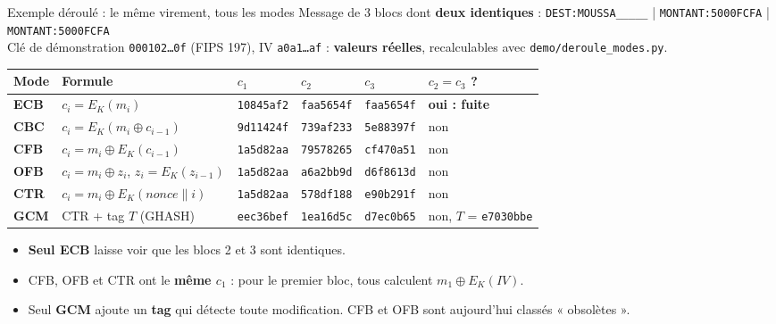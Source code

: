 \documentclass[aspectratio=169,10pt]{beamer}
\begin{document}
\begin{frame}{Exemple déroulé : le même virement, tous les modes}
  \small Message de 3 blocs dont \textbf{deux identiques} :
  \texttt{DEST:MOUSSA\_\_\_\_\_} \;|\; \texttt{MONTANT:5000FCFA} \;|\; \texttt{MONTANT:5000FCFA}\\[0.1em]
  \scriptsize Clé de démonstration \texttt{000102\ldots0f} (FIPS 197), IV \texttt{a0a1\ldots af} : \textbf{valeurs réelles}, recalculables avec \texttt{demo/deroule\_modes.py}.
  \vspace{0.3em}

  \centering\scriptsize
  \begin{tabular}{llllll}
    \toprule
    Mode & Formule & $c_1$ & $c_2$ & $c_3$ & $c_2 = c_3$ ? \\
    \midrule
    \textbf{ECB} & $c_i = E_K(m_i)$ & \texttt{10845af2} & \textcolor{espred}{\texttt{faa5654f}} & \textcolor{espred}{\texttt{faa5654f}} & \textcolor{espred}{\textbf{oui : fuite}} \\
    \textbf{CBC} & $c_i = E_K(m_i \oplus c_{i-1})$ & \texttt{9d11424f} & \texttt{739af233} & \texttt{5e88397f} & non \\
    \textbf{CFB} & $c_i = m_i \oplus E_K(c_{i-1})$ & \texttt{1a5d82aa} & \texttt{79578265} & \texttt{cf470a51} & non \\
    \textbf{OFB} & $c_i = m_i \oplus z_i$, $z_i = E_K(z_{i-1})$ & \texttt{1a5d82aa} & \texttt{a6a2bb9d} & \texttt{d6f8613d} & non \\
    \textbf{CTR} & $c_i = m_i \oplus E_K(\mathit{nonce} \| i)$ & \texttt{1a5d82aa} & \texttt{578df188} & \texttt{e90b291f} & non \\
    \textbf{GCM} & CTR + tag $T$ (GHASH) & \texttt{eec36bef} & \texttt{1ea16d5c} & \texttt{d7ec0b65} & non, $T$ = \texttt{e7030bbe} \\
    \bottomrule
  \end{tabular}
  \vspace{0.4em}

  \raggedright\scriptsize
  \begin{itemize}
    \item \textbf{Seul ECB} laisse voir que les blocs 2 et 3 sont identiques.
    \item CFB, OFB et CTR ont le \textbf{même $c_1$} : pour le premier bloc, tous calculent $m_1 \oplus E_K(\mathit{IV})$.
    \item Seul \textbf{GCM} ajoute un \textbf{tag} qui détecte toute modification. CFB et OFB sont aujourd'hui classés « obsolètes ».
  \end{itemize}
\end{frame}
\end{document}

